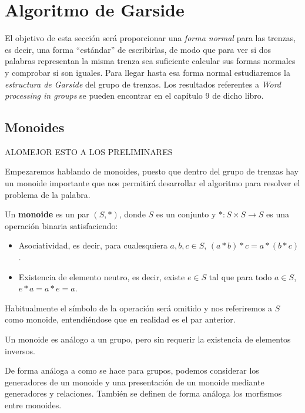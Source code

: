 \documentclass[bibtex, anon]{TEMat-article}
\begin{document}
\section{Algoritmo de Garside}
El objetivo de esta sección será proporcionar una \emph{forma normal} para las trenzas, es decir, una forma ``estándar'' de escribirlas, de modo que para ver si dos palabras representan la misma trenza sea suficiente calcular sus formas normales y comprobar si son iguales. Para llegar hasta esa forma normal estudiaremos la \emph{estructura de Garside} del grupo de trenzas. Los resultados referentes a \emph{Word processing in groups} \cite{Thurston} se pueden encontrar en el capítulo 9 de dicho libro.




\subsection{Monoides}
ALOMEJOR ESTO A LOS PRELIMINARES

Empezaremos hablando de monoides, puesto que dentro del grupo de trenzas hay un monoide importante que nos permitirá desarrollar el algoritmo para resolver el problema de la palabra.



\begin{definicion}
	Un \textbf{monoide} es un par $(S,*)$, donde $S$ es un conjunto y $*:S\times S\to S$ es una operación binaria satisfaciendo:
	\begin{itemize}
		\item Asociatividad, es decir, para cualesquiera $a,b,c\in S$, $(a*b)*c=a*(b*c)$.
		\item Existencia de elemento neutro, es decir, existe $e\in S$ tal que para todo $a\in S$, $e*a=a*e=a$. 
	\end{itemize}
	Habitualmente el símbolo de la operación será omitido y nos referiremos a $S$ como monoide, entendiéndose que en realidad es el par anterior.
\end{definicion}

\begin{observacion}
	Un monoide es análogo a un grupo, pero sin requerir la existencia de elementos inversos.
\end{observacion}

De forma análoga a como se hace para grupos, podemos considerar los generadores de un monoide y una presentación de un monoide mediante generadores y relaciones. También se definen de forma análoga los morfismos entre monoides. 
\end{document}
